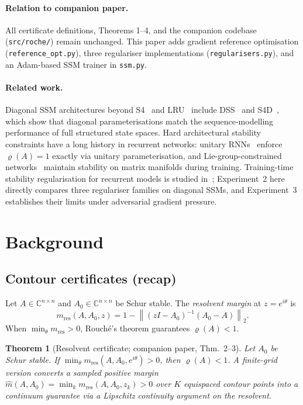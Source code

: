 \documentclass{article}
\newtheorem{theorem}{Theorem}
\theoremstyle{definition}
\newcommand{\C}{\mathbb{C}}
\newcommand{\norm}[1]{\left\|#1\right\|}
\begin{document}
\paragraph{Relation to companion paper.}
All certificate definitions, Theorems 1--4, and the companion codebase
(\texttt{src/roche/}) remain unchanged.  This paper adds gradient
reference optimisation (\texttt{reference\_opt.py}), three regulariser
implementations (\texttt{regularisers.py}), and an Adam-based SSM
trainer in \texttt{ssm.py}.

\paragraph{Related work.}
Diagonal SSM architectures beyond S4~\cite{gu2022s4} and
LRU~\cite{smith2023simplified} include DSS~\cite{gupta2022dss} and
S4D~\cite{gu2022s4d}, which show that diagonal parameterisations match
the sequence-modelling performance of full structured state spaces.
Hard architectural stability constraints have a long history in
recurrent networks: unitary RNNs~\cite{arjovsky2016unitary} enforce
$\varrho(A)=1$ exactly via unitary parameterisation, and
Lie-group-constrained networks~\cite{lezcano2019cheap} maintain
stability on matrix manifolds during training.
Training-time stability regularisation for recurrent
models is studied in~\cite{miller2019stable,erichson2021lipschitz};
Experiment~2 here directly compares three regulariser families on
diagonal SSMs, and Experiment~3 establishes their limits under
adversarial gradient pressure.

\section{Background}
\label{sec:background}

\subsection{Contour certificates (recap)}

Let $A \in \C^{n \times n}$ and $A_0 \in \C^{n \times n}$ be Schur stable.
The \emph{resolvent margin} at $z = e^{i\theta}$ is
\[
  m_{\mathrm{res}}(A, A_0, z)
  = 1 - \norm{(zI - A_0)^{-1}(A_0 - A)}_2.
\]
When $\min_\theta m_{\mathrm{res}} > 0$, Rouch\'e's theorem guarantees
$\varrho(A) < 1$.

\begin{theorem}[Resolvent certificate; companion paper, Thm.~2--3]
\label{thm:res_cert}
Let $A_0$ be Schur stable.  If
$\min_\theta m_{\mathrm{res}}(A, A_0, e^{i\theta}) > 0$, then
$\varrho(A) < 1$.  A finite-grid version converts a sampled positive
margin $\hat{m}(A, A_0) = \min_k m_{\mathrm{res}}(A, A_0, z_k) > 0$
over $K$ equispaced contour points into a continuum guarantee via a
Lipschitz continuity argument on the resolvent.
\end{theorem}
\end{document}
